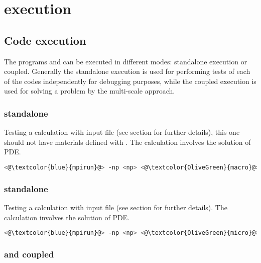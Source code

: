 \chapter*{\sputnik execution}




\section{Code execution}

The \sputnik programs \macro and \micro can be executed in different modes: standalone
execution or coupled. Generally the standalone execution is used for performing tests of 
each of the codes independently for debugging purposes, while the coupled execution is
used for solving a problem by the multi-scale approach.

\subsection{\macro standalone}

Testing a \macro calculation with input file (see section for further details), this one should not have materials defined with \micflag.
The calculation involves the solution of PDE.
\begin{lstlisting}[frame=single,language=bash]
<@\textcolor{blue}{mpirun}@> -np <np> <@\textcolor{OliveGreen}{macro}@> -input <input.mac>
\end{lstlisting}

\subsection{\micro standalone}

Testing a \micro calculation with input file (see section for further details).
The calculation involves the solution of PDE.
\begin{lstlisting}[frame=single,language=bash]
<@\textcolor{blue}{mpirun}@> -np <np> <@\textcolor{OliveGreen}{micro}@> -input <input.mic>
\end{lstlisting}

\subsection{\macro and \micro coupled}

